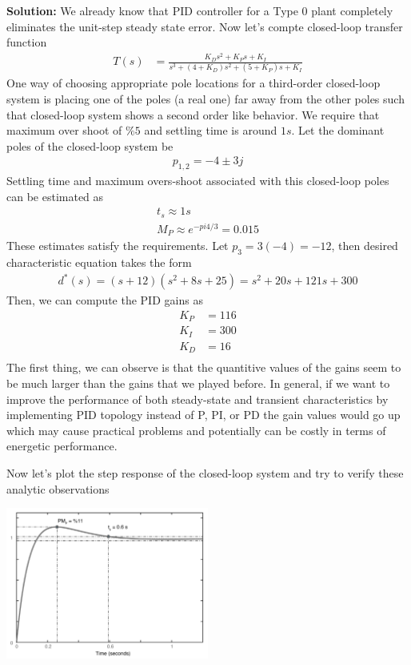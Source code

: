 \documentclass[twoside]{article}
\begin{document}
\textbf{Solution:} We already know that PID controller for a Type 0
plant completely eliminates the unit-step steady state error. Now 
let's compte closed-loop transfer function
%
\begin{align*}
  T(s) &= \frac{K_D s^2 +  K_P s +  K_I}{ s^3 + (4 + K_D) s^2 + (5 +K_P) s +  K_I}
\end{align*}
%
One way of choosing appropriate pole locations for a third-order
closed-loop system is placing one of the poles (a real one) far away from the
other poles such that closed-loop system shows a second order
like behavior. We require that maximum over shoot of $\% 5$
and settling time is around $1 s$. Let the dominant poles of the
closed-loop system be
%
\begin{align*}
  p_{1,2} = -4 \pm 3 j
\end{align*}
%
Settling time and maximum overs-shoot associated with this
closed-loop poles can be estimated as
%
\begin{align*}
 t_s \approx 1 s
\\
M_P \approx e^{-pi 4/3} = 0.015 
\end{align*}
%
These estimates satisfy the requirements. Let $p_3 = 3 (-4) = -12$, then
desired characteristic equation takes the form
%
\begin{align*}
d^*(s) = (s + 12)(s^2 + 8 s + 25) = s^2 + 20 s + 121 s + 300
\end{align*}
% 
Then, we can compute the PID gains as
%
\begin{align*}
  K_P &=  116 \\
  K_I &= 300 \\
  K_D &= 16\\
\end{align*}
%
The first thing, we can observe is that the quantitive values of the gains 
seem to be much larger than the gains that we played before.
In general, if we want to improve the performance of both
steady-state and transient characteristics by implementing PID 
topology instead of P, PI, or PD the gain values would go up
which may cause practical problems and potentially
can be costly in terms of energetic performance. 

Now let's plot the step response of the closed-loop
system and try to verify these analytic observations

\vspace{12 pt}

  \begin{minipage}[h]{1\linewidth}
    \begin{center}
      \includegraphics[width=0.5\textwidth]{PIDe}
    \end{center}
  \end{minipage}
\end{document}
